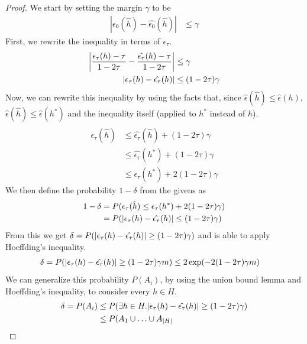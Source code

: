 \documentclass[11pt,a4paper,titlepage]{article}
\begin{document}
{\subsection{}{
\begin{proof}
We start by setting the margin $\gamma$ to be
\begin{align*}
	|\epsilon_0(\hat{h}) - \hat{\epsilon_0}(\hat{h})| &\leq \gamma
\end{align*}
First, we rewrite the inequality in terms of $\epsilon_\tau$.
\begin{align*}
	\abs{\frac{\epsilon_\tau(h) - \tau}{1-2\tau} - \frac{\hat{\epsilon_\tau}(h) - \tau}{1-2\tau}} &\leq \gamma
    \\ \abs{\epsilon_\tau(h) - \hat{\epsilon_\tau}(h)} &\leq (1-2\tau) \gamma
\end{align*}
Now, we can rewrite this inequality by using the facts that, since $\hat{\epsilon}(\hat{h}) \leq \hat{\epsilon}(h)$, $\hat{\epsilon}(\hat{h}) \leq \hat{\epsilon}(h^*)$ and the inequality itself (applied to $h^*$ instead of $h$).
\begin{align*}
    \\ \epsilon_\tau(\hat{h}) &\leq \hat{\epsilon_\tau}(\hat{h}) + (1-2\tau) \gamma
    \\ &\leq \hat{\epsilon_\tau}(h^*) + (1-2\tau) \gamma
    \\ &\leq \epsilon_\tau(h^*) + 2 (1-2\tau) \gamma
\end{align*}
We then define the probability $1-\delta$ from the givens as
\begin{align*}
	1-\delta &= P(\epsilon_\tau(\hat{h}) \leq \epsilon_\tau(h^*) + 2 (1-2\tau) \gamma)
    \\&= P(\abs{\epsilon_\tau(h) - \hat{\epsilon_\tau}(h)} \leq (1-2\tau) \gamma)
\end{align*}
From this we get $\delta = P(\abs{\epsilon_\tau(h) - \hat{\epsilon_\tau}(h)} \geq (1-2\tau) \gamma)$ and is able to apply Hoeffding's inequality.
\begin{align*}
	\delta = P(\abs{\epsilon_\tau(h) - \hat{\epsilon_\tau}(h)} \geq (1-2\tau) \gamma m) &\leq 2\exp(-2 (1-2\tau) \gamma m)
\end{align*}
We can generalize this probability $P(A_i)$, by using the union bound lemma and Hoeffding's inequality, to consider every $h\in H$.
\begin{align*}
	\delta = P(A_i) &\leq P(\exists h \in H. \abs{\epsilon_\tau(h) - \hat{\epsilon_\tau}(h)} \geq (1-2\tau) \gamma)
    \\ &\leq P(A_1 \cup \ldots \cup A_{|H|}

\end{align*}
\end{proof}}}
\end{document}

